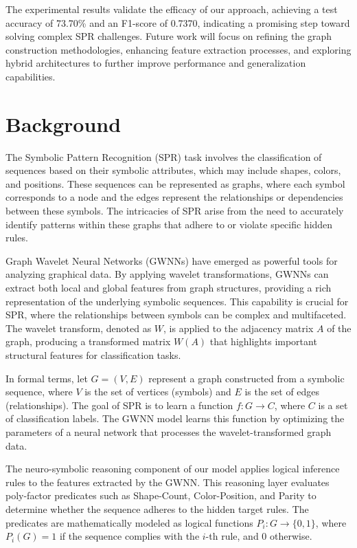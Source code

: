 \documentclass{article}
\begin{document}
The experimental results validate the efficacy of our approach, achieving a test accuracy of 73.70\% and an F1-score of 0.7370, indicating a promising step toward solving complex SPR challenges. Future work will focus on refining the graph construction methodologies, enhancing feature extraction processes, and exploring hybrid architectures to further improve performance and generalization capabilities.

\section{Background}
The Symbolic Pattern Recognition (SPR) task involves the classification of sequences based on their symbolic attributes, which may include shapes, colors, and positions. These sequences can be represented as graphs, where each symbol corresponds to a node and the edges represent the relationships or dependencies between these symbols. The intricacies of SPR arise from the need to accurately identify patterns within these graphs that adhere to or violate specific hidden rules.

Graph Wavelet Neural Networks (GWNNs) have emerged as powerful tools for analyzing graphical data. By applying wavelet transformations, GWNNs can extract both local and global features from graph structures, providing a rich representation of the underlying symbolic sequences. This capability is crucial for SPR, where the relationships between symbols can be complex and multifaceted. The wavelet transform, denoted as \( W \), is applied to the adjacency matrix \( A \) of the graph, producing a transformed matrix \( W(A) \) that highlights important structural features for classification tasks.

In formal terms, let \( G = (V, E) \) represent a graph constructed from a symbolic sequence, where \( V \) is the set of vertices (symbols) and \( E \) is the set of edges (relationships). The goal of SPR is to learn a function \( f: G \rightarrow C \), where \( C \) is a set of classification labels. The GWNN model learns this function by optimizing the parameters of a neural network that processes the wavelet-transformed graph data.

The neuro-symbolic reasoning component of our model applies logical inference rules to the features extracted by the GWNN. This reasoning layer evaluates poly-factor predicates such as Shape-Count, Color-Position, and Parity to determine whether the sequence adheres to the hidden target rules. The predicates are mathematically modeled as logical functions \( P_i: G \rightarrow \{0, 1\} \), where \( P_i(G) = 1 \) if the sequence complies with the \( i \)-th rule, and \( 0 \) otherwise.
\end{document}
